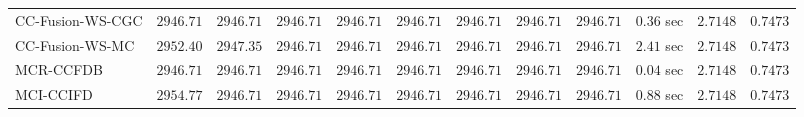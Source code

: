 \begin{table}[H]
\begin{tabular}{lrrrrrrrrrrr}
    CC-Fusion-WS-CGC & $      2946.71$ & $      2946.71$ & $      2946.71$ & $      2946.71$ & $      2946.71$ & $      2946.71$ & $      2946.71$ & $      2946.71$ & $         0.36$ sec    & $       2.7148$  & $       0.7473$ \\ 
     CC-Fusion-WS-MC & $      2952.40$ & $      2947.35$ & $      2946.71$ & $      2946.71$ & $      2946.71$ & $      2946.71$ & $      2946.71$ & $      2946.71$ & $         2.41$ sec    & $       2.7148$  & $       0.7473$ \\ 
\cmidrule{1-1} 
           MCR-CCFDB & $      2946.71$ & $      2946.71$ & $      2946.71$ & $      2946.71$ & $      2946.71$ & $      2946.71$ & $      2946.71$ & $      2946.71$ & $         0.04$ sec    & $       2.7148$  & $       0.7473$ \\ 
\cmidrule{1-1} 
           MCI-CCIFD & $      2954.77$ & $      2946.71$ & $      2946.71$ & $      2946.71$ & $      2946.71$ & $      2946.71$ & $      2946.71$ & $      2946.71$ & $         0.88$ sec    & $       2.7148$  & $       0.7473$ \\ 
\bottomrule
\end{tabular}
\end{table}


